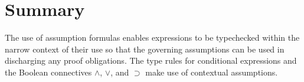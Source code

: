 \documentclass [12pt,twoside]{cslreport}
\newcommand{\tauGamma}[1]{\tau(\Gamma)(#1)}
\begin{document}
\section{Summary}

The use of assumption formulas  enables expressions
to be typechecked within the narrow context of their use so that
the governing assumptions can be used in discharging any
proof obligations.  The type rules for conditional expressions and the
Boolean connectives $\wedge$, $\vee$, and $\supset$ make use of
contextual assumptions.  

\begin{comment}
We will assume that the context $\Gamma$ used below contain the
theories \mathtt{equality} and \mathtt{if\_def}\@.  
The typechecking of constant definitions is straightforward when
the definitions are not recursive.  As we have already seen, the
form of an explicit definitions is $ s : T = a$, where $s$ is a symbol,
$T$ is a type, and $a$ is a term.  
When a constant is defined, no nonemptiness TCCs are generated since
there is a definition present.
%
\begin{eqnarray*}
  \tauGamma{\Delta, s : T = a} & = & \mathtt{CONTEXT}, \mbox{ if }
    \tauGamma{\Delta} = \mathtt{CONTEXT} \\ & &
   \tau(\Gamma, \Delta)(T)  = \mathtt{TYPE}\\ & &
   \tau(\Gamma, \Delta)(a) = T', \mbox{ and}\\ & &
   (T\sim_\Gamma T')_{\Gamma, \Delta}\\& &
   \vdash_{\Gamma, \Delta} \pi(T)(a)
\end{eqnarray*}
%
A recursive constant definition has the syntactic form
$ s : RECURSIVE\ T = a\ MEASURE\ f RELATION p$\@.
%
\memo{This looks slightly complicated. Postpone for now.}
%
A formula declaration has the form
$s : \ \mathtt{FORMULA} a$.
%
\memo{Need to formally defined substitution, freevars, and closure
relative to a context.}  
\end{comment}

\begin{comment}
%
\memo{Need to highlight the shape of a context: theory declarations
followed by type/constant declarations followed by variable declarations.}
%
Introduce equality, if-then-else, connectives, updates.
%
\section{Abstract Datatypes}
\end{comment}
\end{document}
